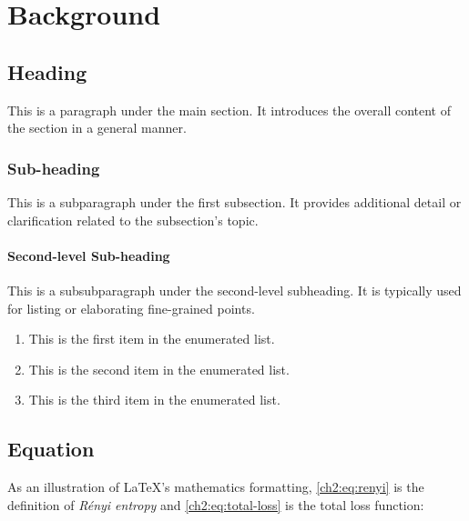 \chapter{Background}
\label{chapter2}

\section{Heading}
\begin{paragraph}
This is a paragraph under the main section. It introduces the overall content of the section in a general manner.
\end{paragraph}

\subsection{Sub-heading}
\begin{subparagraph}
This is a subparagraph under the first subsection. It provides additional detail or clarification related to the subsection's topic.
\end{subparagraph}

\subsubsection{Second-level Sub-heading}
\begin{subsubparagraph}
This is a subsubparagraph under the second-level subheading. It is typically used for listing or elaborating fine-grained points.
\end{subsubparagraph}

\begin{enumerate}[itemindent=\subsubparitemindent]
    \item This is the first item in the enumerated list.
    \item This is the second item in the enumerated list.
    \item This is the third item in the enumerated list.
\end{enumerate}

\section{Equation}
\begin{paragraph}
As an illustration of \LaTeX's mathematics formatting, \autoref{ch2:eq:renyi} is the definition of {\em R\'enyi entropy} and \autoref{ch2:eq:total-loss} is the total loss function:
\end{paragraph}

